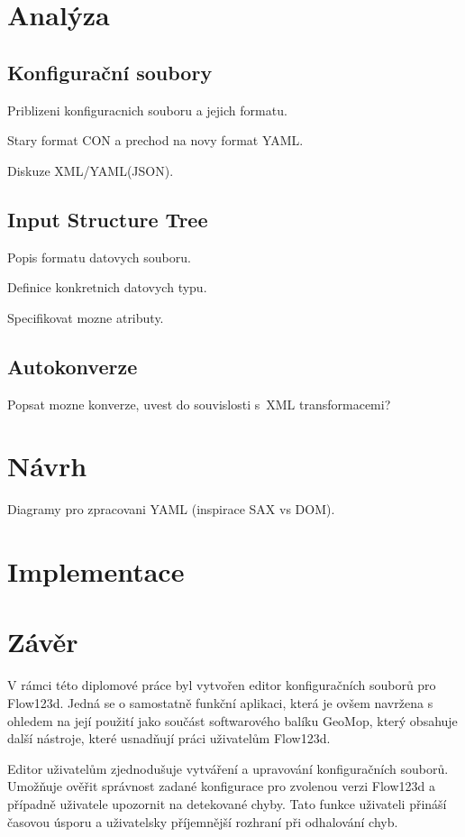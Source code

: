 \documentclass[FM,DP]{tulthesis}
\begin{document}
\chapter{Analýza}


\section{Konfigurační soubory}
Priblizeni konfiguracnich souboru a jejich formatu.

Stary format CON a prechod na novy format YAML.

Diskuze XML/YAML(JSON). 

\section{Input Structure Tree}
Popis formatu datovych souboru.

Definice konkretnich datovych typu.

Specifikovat mozne atributy.

\section{Autokonverze}
Popsat mozne konverze, uvest do souvislosti s~XML transformacemi?


\chapter{Návrh}
Diagramy pro zpracovani YAML (inspirace SAX vs DOM).




\chapter{Implementace}


\chapter*{Závěr}
V rámci této diplomové práce byl vytvořen editor konfiguračních souborů pro Flow123d. Jedná se o samostatně funkční aplikaci, která je ovšem navržena s ohledem na její použití jako součást softwarového balíku GeoMop, který obsahuje další nástroje, které usnadňují práci uživatelům Flow123d.

Editor uživatelům zjednodušuje vytváření a upravování konfiguračních souborů. Umožňuje ověřit správnost zadané konfigurace pro zvolenou verzi Flow123d a případně uživatele upozornit na detekované chyby. Tato funkce uživateli přináší časovou úsporu a uživatelsky příjemnější rozhraní při odhalování chyb.
\end{document}
